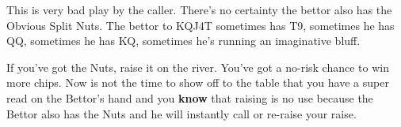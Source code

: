This is very bad play by the caller. There's no certainty the bettor also has
the Obvious Split Nuts. The bettor to KQJ4T sometimes has T9, sometimes
he has QQ, sometimes he has KQ, sometimes he's running an imaginative
bluff.

If you've got the Nuts, raise it on the river. You've got a no-risk
chance to win more chips. Now is not the time to show off to the table
that you have a super read on the Bettor's hand and you \textbf{know}
that raising is no use because the Bettor also has the Nuts and he will
instantly call or re-raise your raise.








